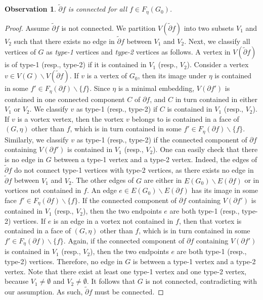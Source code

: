 \documentclass[a4paper,11pt]{article}
\numberwithin{lemma}{section}
\newtheorem{observation}[lemma]{Observation}
\begin{document}
\begin{observation} \label{obs-vortexfaceconn}
$\tilde{\partial} f$ is connected for all $f \in F_\eta(G_0)$.
\end{observation}

\begin{proof}
Assume $\tilde{\partial} f$ is not connected.
We partition $V(\tilde{\partial} f)$ into two subsets $V_1$ and $V_2$ such that there exists no edge in $\tilde{\partial} f$ between $V_1$ and $V_2$.
Next, we classify all vertices of $G$ as \emph{type-1} vertices and \emph{type-2} vertices as follows.
A vertex in $V(\tilde{\partial} f)$ is of type-1 (resp., type-2) if it is contained in $V_1$ (resp., $V_2$).
Consider a vertex $v \in V(G) \backslash V(\tilde{\partial} f)$.
If $v$ is a vertex of $G_0$, then its image under $\eta$ is contained in some $f' \in F_\eta(\partial f) \backslash \{f\}$.
Since $\eta$ is a minimal embedding, $V(\partial f')$ is contained in one connected component $C$ of $\partial f$, and $C$ in turn contained in either $V_1$ or $V_2$.
We classify $v$ as type-1 (resp., type-2) if $C$ is contained in $V_1$ (resp., $V_2$).
If $v$ is a vortex vertex, then the vortex $v$ belongs to is contained in a face of $(G,\eta)$ other than $f$, which is in turn contained in some $f' \in F_\eta(\partial f) \backslash \{f\}$.
Similarly, we classify $v$ as type-1 (resp., type-2) if the connected component of $\partial f$ containing $V(\partial f')$ is contained in $V_1$ (resp., $V_2$).
One can easily check that there is no edge in $G$ between a type-1 vertex and a type-2 vertex.
Indeed, the edges of $\tilde{\partial} f$ do not connect type-1 vertices with type-2 vertices, as there exists no edge in $\tilde{\partial} f$ between $V_1$ and $V_2$.
The other edges of $G$ are either in $E(G_0) \backslash E(\partial f)$ or in vortices not contained in $f$.
An edge $e \in E(G_0) \backslash E(\partial f)$ has its image in some face $f' \in F_\eta(\partial f) \backslash \{f\}$.
If the connected component of $\partial f$ containing $V(\partial f')$ is contained in $V_1$ (resp., $V_2$), then the two endpoints $e$ are both type-1 (resp., type-2) vertices.
If $e$ is an edge in a vortex not contained in $f$, then that vortex is contained in a face of $(G,\eta)$ other than $f$, which is in turn contained in some $f' \in F_\eta(\partial f) \backslash \{f\}$.
Again, if the connected component of $\partial f$ containing $V(\partial f')$ is contained in $V_1$ (resp., $V_2$), then the two endpoints $e$ are both type-1 (resp., type-2) vertices.
Therefore, no edge in $G$ is between a type-1 vertex and a type-2 vertex.
Note that there exist at least one type-1 vertex and one type-2 vertex, because $V_1 \neq \emptyset$ and $V_2 \neq \emptyset$.
It follows that $G$ is not connected, contradicting with our assumption.
As such, $\tilde{\partial} f$ must be connected.
\end{proof}
\end{document}

